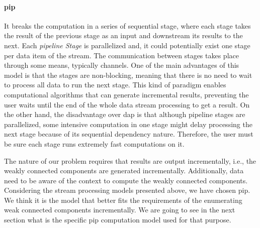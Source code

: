 \paragraph{\acrfull{pip}} It breaks the computation in a series of sequential stage, where each stage takes the result of the previous stage as an input and downstream its results to the next. 
Each \emph{pipeline Stage} is parallelized and, it could potentially exist one stage per data item of the stream. 
The communication between stages takes place through some means, typically channels. One of the main advantages of this model is that the stages are non-blocking, meaning that there is no need to wait to process all data to run the next stage. 
This kind of paradigm enables computational algorithms that can generate incremental results, preventing the user waits until the end of the whole data stream processing to get a result. 
On the other hand, the disadvantage over \acrshort{dap} is that although pipeline stages are parallelized, some intensive computation in one stage might delay processing the next stage because of its sequential dependency nature. Therefore, the user must be sure each stage runs extremely fast computations on it.

The nature of our problem requires that results are  output incrementally, i.e.,   the weakly connected components are generated incrementally. Additionally, data need to be aware of the context to compute the weakly connected components. Considering the stream processing models presented above, we have chosen  \acrshort{pip}. We think it is the model that better fits the requirements of the enumerating weak connected components incrementally. 
We are going to see in the next section what is the specific \acrshort{pip} computation model used for that purpose.

